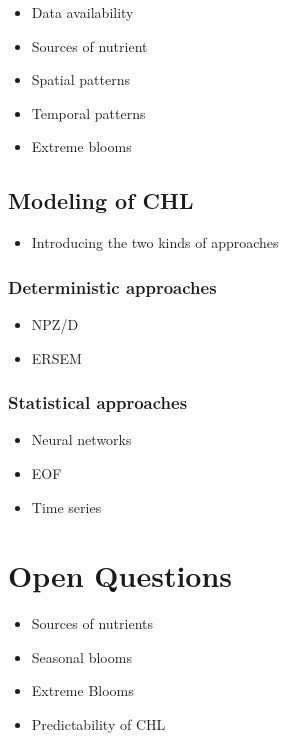 			\begin{itemize}
				\item Data availability
				\item Sources of nutrient
				\item Spatial patterns
				\item Temporal patterns
				\item Extreme blooms
			\end{itemize}

	\subsection{Modeling of CHL}
	\label{intro:context:modeling}

		\begin{itemize}
			\item Introducing the two kinds of approaches
		\end{itemize}

		\subsubsection{Deterministic approaches}

			\begin{itemize}
				\item NPZ/D
				\item ERSEM
			\end{itemize}

		\subsubsection{Statistical approaches}

			\begin{itemize}
				\item Neural networks
				\item EOF
				\item Time series
			\end{itemize}

\section{Open Questions}
\label{intro:questions}

	\begin{itemize}
		\item Sources of nutrients
		\item Seasonal blooms
		\item Extreme Blooms
		\item Predictability of CHL
	\end{itemize}

